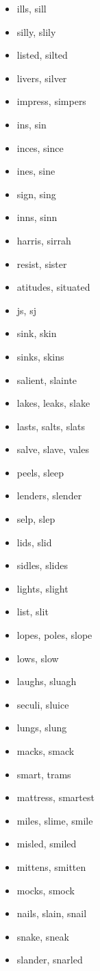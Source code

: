 \documentclass[a4wide,11pt]{report}
\begin{document}
\begin{itemize}
  \item ills, sill
  \item silly, slily
  \item listed, silted
  \item livers, silver
  \item impress, simpers
  \item ins, sin
  \item inces, since
  \item ines, sine
  \item sign, sing
  \item inns, sinn
  \item harris, sirrah
  \item resist, sister
  \item atitudes, situated
  \item js, sj
  \item sink, skin
  \item sinks, skins
  \item salient, slainte
  \item lakes, leaks, slake
  \item lasts, salts, slats
  \item salve, slave, vales
  \item peels, sleep
  \item lenders, slender
  \item selp, slep
  \item lids, slid
  \item sidles, slides
  \item lights, slight
  \item list, slit
  \item lopes, poles, slope
  \item lows, slow
  \item laughs, sluagh
  \item seculi, sluice
  \item lungs, slung
  \item macks, smack
  \item smart, trams
  \item mattress, smartest
  \item miles, slime, smile
  \item misled, smiled
  \item mittens, smitten
  \item mocks, smock
  \item nails, slain, snail
  \item snake, sneak
  \item slander, snarled

\end{itemize}
\end{document}
